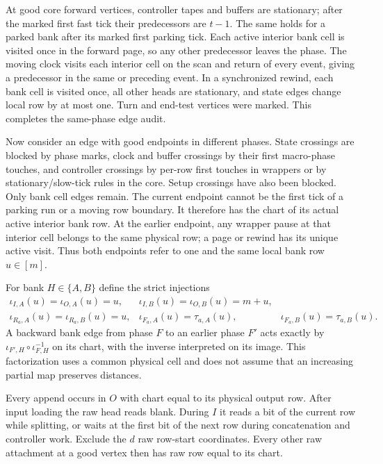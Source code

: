 \begin{informalproof}
At good core forward vertices, controller tapes and buffers are stationary;
after the marked first fast tick their predecessors are $t-1$.  The same
holds for a parked bank after its marked first parking tick.  Each active
interior bank cell is visited once in the forward page, so any other
predecessor leaves the phase.  The moving clock visits each interior cell
on the scan and return of every event, giving a predecessor in the same
or preceding event.  In a synchronized rewind, each bank cell is visited
once, all other heads are stationary, and state edges change local row by
at most one.  Turn and end-test vertices were marked.  This completes the
same-phase edge audit.

Now consider an edge with good endpoints in different phases.  State
crossings are blocked by phase marks, clock and buffer crossings by their
first macro-phase touches, and controller crossings by per-row first
touches in wrappers or by stationary/slow-tick rules in the core.  Setup
crossings have also been blocked.  Only bank cell edges remain.  The
current endpoint cannot be the first tick of a parking run or a moving
row boundary.  It therefore has the chart of its actual active interior
bank row.  At the earlier endpoint, any wrapper pause at that interior
cell belongs to the same physical row; a page or rewind has its unique
active visit.  Thus both endpoints refer to one and the same local bank
row $u\in[m]$.

For bank $H\in\{A,B\}$ define the strict injections
\[
 \begin{array}{lll}
 \iota_{I,A}(u)=\iota_{O,A}(u)=u,&
 \iota_{I,B}(u)=\iota_{O,B}(u)=m+u,\\
 \iota_{R_a,A}(u)=\iota_{R_a,B}(u)=u,&
 \iota_{F_a,A}(u)=\tau_{a,A}(u),&
 \iota_{F_a,B}(u)=\tau_{a,B}(u).
 \end{array}
\]
A backward bank edge from phase $F$ to an earlier phase $F'$ acts exactly
by $\iota_{F',H}\circ \iota_{F,H}^{-1}$ on its chart, with the inverse interpreted
on its image.  This factorization uses a common physical cell and does
not assume that an increasing partial map preserves distances.

Every append occurs in $O$ with chart equal to its physical output row.
After input loading the raw head reads blank.  During $I$ it reads a bit
of the current row while splitting, or waits at the first bit of the next
row during concatenation and controller work.  Exclude the $d$ raw
row-start coordinates.  Every other raw attachment at a good vertex then
has raw row equal to its chart.


\end{informalproof}
